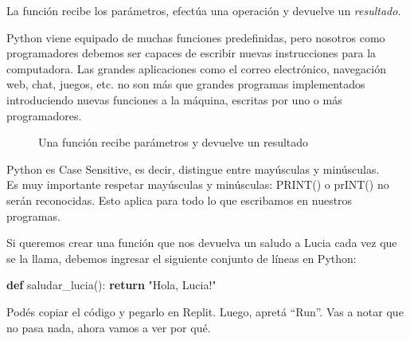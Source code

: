 \documentclass[
  letterpaper,
  DIV=11,
  numbers=noendperiod]{scrreprt}
\makeatletter
\newenvironment{Shaded}{\begin{snugshade}}{\end{snugshade}}
\newcommand{\ControlFlowTok}[1]{\textcolor[rgb]{0.00,0.23,0.31}{\textbf{#1}}}
\newcommand{\KeywordTok}[1]{\textcolor[rgb]{0.00,0.23,0.31}{\textbf{#1}}}
\newcommand{\NormalTok}[1]{\textcolor[rgb]{0.00,0.23,0.31}{#1}}
\newcommand{\StringTok}[1]{\textcolor[rgb]{0.13,0.47,0.30}{#1}}
\newcommand*\pandocbounded[1]{%
  \sbox\pandoc@box{#1}%
  \Gscale@div\@tempa{\textheight}{\dimexpr\ht\pandoc@box+\dp\pandoc@box\relax}%
  \Gscale@div\@tempb{\linewidth}{\wd\pandoc@box}%
  \ifdim\@tempb\p@<\@tempa\p@\let\@tempa\@tempb\fi%
  \ifdim\@tempa\p@<\p@\scalebox{\@tempa}{\usebox\pandoc@box}%
  \else\usebox{\pandoc@box}%
  \fi%
}
\makeatother
\begin{document}
La función recibe los parámetros, efectúa una operación y devuelve un
\emph{resultado}.

Python viene equipado de muchas funciones predefinidas, pero nosotros
como programadores debemos ser capaces de escribir nuevas instrucciones
para la computadora. Las grandes aplicaciones como el correo
electrónico, navegación web, chat, juegos, etc. no son más que grandes
programas implementados introduciendo nuevas funciones a la máquina,
escritas por uno o más programadores.

\begin{figure}[H]

{\centering \pandocbounded{\texttt{[image: ./imgs/unidad\_2/funcion.png]}}

}

\caption{Una función recibe parámetros y devuelve un resultado}

\end{figure}%

\begin{tcolorbox}[enhanced jigsaw, opacitybacktitle=0.6, toptitle=1mm, toprule=.15mm, arc=.35mm, breakable, bottomrule=.15mm, opacityback=0, leftrule=.75mm, rightrule=.15mm, title=\textcolor{quarto-callout-note-color}{\faInfo}\hspace{0.5em}{Python es Case Sensitive}, left=2mm, bottomtitle=1mm, colframe=quarto-callout-note-color-frame, colback=white, titlerule=0mm, coltitle=black, colbacktitle=quarto-callout-note-color!10!white]

Python es Case Sensitive, es decir, distingue entre mayúsculas y
minúsculas.\\
Es muy importante respetar mayúsculas y minúsculas: PRINT() o prINT() no
serán reconocidas. Esto aplica para todo lo que escribamos en nuestros
programas.

\end{tcolorbox}

Si queremos crear una función que nos devuelva un saludo a Lucia cada
vez que se la llama, debemos ingresar el siguiente conjunto de líneas en
Python:

\begin{Shaded}
\begin{Highlighting}[]
\KeywordTok{def}\NormalTok{ saludar\_lucia():}
  \ControlFlowTok{return} \StringTok{"Hola, Lucia!"}
\end{Highlighting}
\end{Shaded}

Podés copiar el código y pegarlo en Replit. Luego, apretá ``Run''. Vas a
notar que no pasa nada, ahora vamos a ver por qué.
\end{document}
